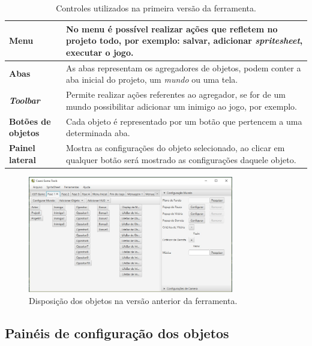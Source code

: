 \documentclass[12pt,twoside,openright,a4paper,english,brazil,sumario=tradicional]{abntex2}
\begin{document}
\begin{table}[h]
   \centering
   \begin{tabular}{| l | p{8cm} |}
      \hline
      \textbf{Menu} & No menu é possível realizar ações que refletem no projeto todo, por exemplo: salvar, adicionar \emph{spritesheet}, executar o jogo. \\
      \hline
      \textbf{Abas} & As abas representam os agregadores de objetos, podem conter a aba inicial do projeto, um \emph{mundo} ou uma tela. \\
      \hline
      \textbf{\emph{Toolbar}} & Permite realizar ações referentes ao agregador, se for de um mundo possibilitar adicionar um inimigo ao jogo, por exemplo. \\
      \hline
      \textbf{Botões de objetos} & Cada objeto é representado por um botão que pertencem a uma determinada aba. \\
      \hline
      \textbf{Painel lateral} & Mostra as configurações do objeto selecionado, ao clicar em qualquer botão será mostrado as configurações daquele objeto.  \\
      \hline
   \end{tabular}
   \caption{Controles utilizados na primeira versão da ferramenta.}
   \label{table:ferramenta_areas}
\end{table}

\begin{figure}[h]
\label{fig:objetos_disp}
\centering
\includegraphics[width=0.8\textwidth]{images/objetos_disposicao.jpg}
\caption{Disposição dos objetos na versão anterior da ferramenta.}
\end{figure}

\subsection{Painéis de configuração dos objetos}
\end{document}
